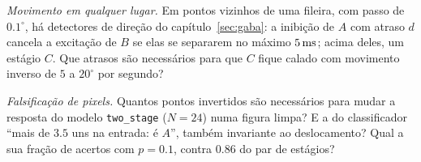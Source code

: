 \begin{exercise}[\lvlB]
\label{ex:12:7}
\emph{Movimento em qualquer lugar.} Em pontos vizinhos de uma fileira, com passo de $0.1^\circ$, há detectores de direção do capítulo~\ref{sec:gaba}: a inibição de $A$ com atraso $d$ cancela a excitação de $B$ se elas se separarem no máximo $5\,\text{ms}$; acima deles, um estágio $C$. Que atrasos são necessários para que $C$ fique calado com movimento inverso de $5$ a $20^\circ$ por segundo?
\end{exercise}

\begin{exercise}[\lvlC]
\label{ex:12:8}
\emph{Falsificação de pixels.} Quantos pontos invertidos são necessários para mudar a resposta do modelo \texttt{two\_stage} ($N=24$) numa figura limpa? E a do classificador ``mais de $3.5$ uns na entrada: é $A$'', também invariante ao deslocamento? Qual a sua fração de acertos com $p=0.1$, contra $0.86$ do par de estágios?
\end{exercise}
